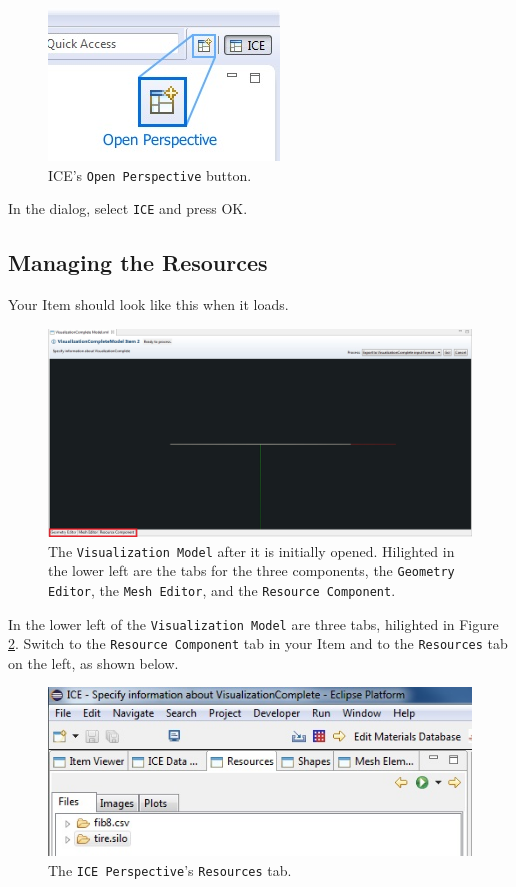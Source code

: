 \begin{figure}[!h]
\includegraphics{images/ICE_OpenPerspective}
\centering
\caption{ICE's \texttt{Open Perspective} button.}
\label{fig:openpersepctive}
\end{figure}

In the dialog, select \texttt{ICE} and press {OK}.

\subsection{Managing the Resources}

Your Item should look like this when it loads.

\begin{figure}[!h]
\includegraphics[width=12cm]{images/ItemTabs}
\centering
\caption{The \texttt{Visualization Model} after it is initially opened.
Hilighted in the lower left are the tabs for the three components, the
\texttt{Geometry Editor}, the \texttt{Mesh Editor}, and the \texttt{Resource
Component}.}
\label{fig:itemtabs}
\end{figure}

In the lower left of the \texttt{Visualization Model} are three tabs, hilighted
in Figure \ref{fig:itemtabs}.
Switch to the \texttt{Resource Component} tab in your Item and to the
\texttt{Resources} tab on the left, as shown below.

\begin{figure}[!h]
\includegraphics[width=12cm]{images/ResourcesTab}
\centering
\caption{The \texttt{ICE Perspective}'s \texttt{Resources} tab.}
\label{fig:resourcestab}
\end{figure}


